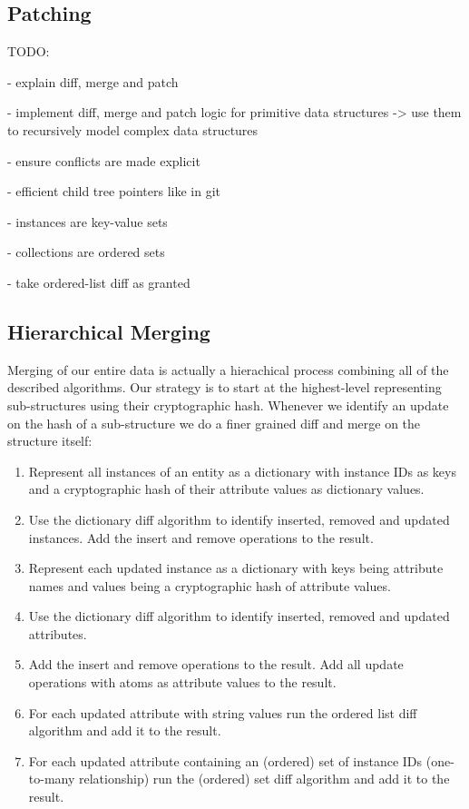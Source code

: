 \subsection{Patching}
\label{sec:main.histo.patching}

TODO:

- explain diff, merge and patch

- implement diff, merge and patch logic for primitive data structures
  -> use them to recursively model complex data structures

- ensure conflicts are made explicit

- efficient child tree pointers like in git

- instances are key-value sets

- collections are ordered sets

- take ordered-list diff as granted

\subsection{Hierarchical Merging}
Merging of our entire data is actually a hierachical process combining all of the described algorithms.
Our strategy is to start at the highest-level representing sub-structures using their cryptographic hash.
Whenever we identify an update on the hash of a sub-structure we do a finer grained diff and merge on the structure itself:

\begin{enumerate}
\item Represent all instances of an entity as a dictionary with instance IDs as keys and a cryptographic hash of their attribute values as dictionary values.
\item Use the dictionary diff algorithm to identify inserted, removed and updated instances. Add the insert and remove operations to the result.
\item Represent each updated instance as a dictionary with keys being attribute names and values being a cryptographic hash of attribute values.
\item Use the dictionary diff algorithm to identify inserted, removed and updated attributes.
\item Add the insert and remove operations to the result. Add all update operations with atoms as attribute values to the result.
\item For each updated attribute with string values run the ordered list diff algorithm and add it to the result.
\item For each updated attribute containing an (ordered) set of instance IDs (one-to-many relationship) run the (ordered) set diff algorithm and add it to the result.
\end{enumerate}

